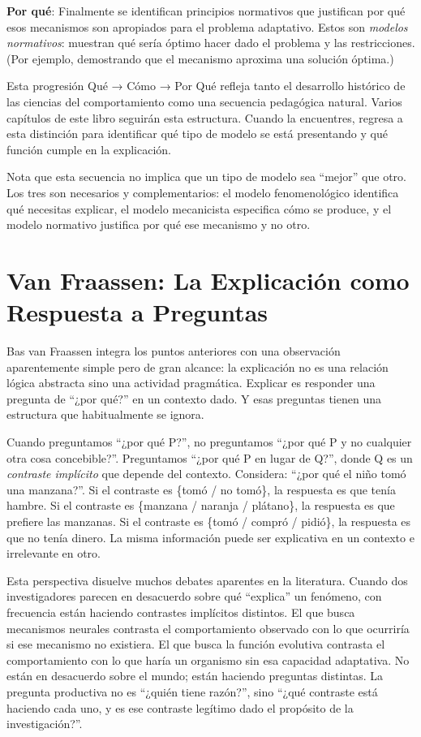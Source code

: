 \documentclass[
  letterpaper,
  DIV=11,
  numbers=noendperiod]{scrreprt}
\begin{document}
\textbf{Por qué}: Finalmente se identifican principios normativos que
justifican por qué esos mecanismos son apropiados para el problema
adaptativo. Estos son \emph{modelos normativos}: muestran qué sería
óptimo hacer dado el problema y las restricciones. (Por ejemplo,
demostrando que el mecanismo aproxima una solución óptima.)

Esta progresión Qué → Cómo → Por Qué refleja tanto el desarrollo
histórico de las ciencias del comportamiento como una secuencia
pedagógica natural. Varios capítulos de este libro seguirán esta
estructura. Cuando la encuentres, regresa a esta distinción para
identificar qué tipo de modelo se está presentando y qué función cumple
en la explicación.

Nota que esta secuencia no implica que un tipo de modelo sea ``mejor''
que otro. Los tres son necesarios y complementarios: el modelo
fenomenológico identifica qué necesitas explicar, el modelo mecanicista
especifica cómo se produce, y el modelo normativo justifica por qué ese
mecanismo y no otro.

\section{Van Fraassen: La Explicación como Respuesta a
Preguntas}\label{van-fraassen-la-explicaciuxf3n-como-respuesta-a-preguntas}

Bas van Fraassen integra los puntos anteriores con una observación
aparentemente simple pero de gran alcance: la explicación no es una
relación lógica abstracta sino una actividad pragmática. Explicar es
responder una pregunta de ``¿por qué?'' en un contexto dado. Y esas
preguntas tienen una estructura que habitualmente se ignora.

Cuando preguntamos ``¿por qué P?'', no preguntamos ``¿por qué P y no
cualquier otra cosa concebible?''. Preguntamos ``¿por qué P en lugar de
Q?'', donde Q es un \emph{contraste implícito} que depende del contexto.
Considera: ``¿por qué el niño tomó una manzana?''. Si el contraste es
\{tomó / no tomó\}, la respuesta es que tenía hambre. Si el contraste es
\{manzana / naranja / plátano\}, la respuesta es que prefiere las
manzanas. Si el contraste es \{tomó / compró / pidió\}, la respuesta es
que no tenía dinero. La misma información puede ser explicativa en un
contexto e irrelevante en otro.

Esta perspectiva disuelve muchos debates aparentes en la literatura.
Cuando dos investigadores parecen en desacuerdo sobre qué ``explica'' un
fenómeno, con frecuencia están haciendo contrastes implícitos distintos.
El que busca mecanismos neurales contrasta el comportamiento observado
con lo que ocurriría si ese mecanismo no existiera. El que busca la
función evolutiva contrasta el comportamiento con lo que haría un
organismo sin esa capacidad adaptativa. No están en desacuerdo sobre el
mundo; están haciendo preguntas distintas. La pregunta productiva no es
``¿quién tiene razón?'', sino ``¿qué contraste está haciendo cada uno, y
es ese contraste legítimo dado el propósito de la investigación?''.
\end{document}
